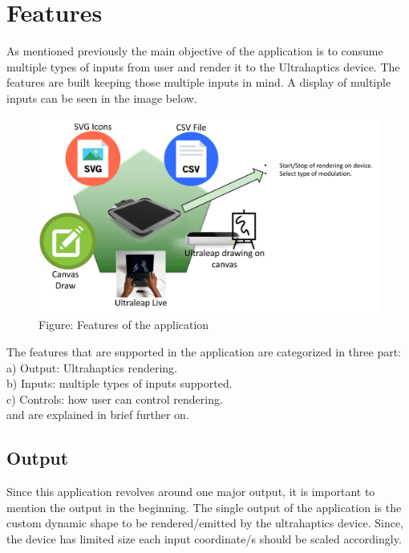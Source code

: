 %
\chapter{Features}
\label{sec:concepts}


As mentioned previously the main objective of the application is to consume multiple types of 
inputs from user and render it to the 
Ultrahaptics device. The features are built keeping those multiple inputs in mind. 
A display of multiple inputs can be seen in the image below.
\begin{figure}[htb]
	\includegraphics[width=\textwidth]{gfx/Features.png}
	\caption{Figure: Features of the application}
	\label{fig:features}
\end{figure}
The features that are supported in the application are categorized in three part: \\[2mm]
a) Output: Ultrahaptics rendering.\\
b) Inputs: multiple types of inputs supported.\\
c) Controls: how user can control rendering.\\[2mm]
and are explained in brief further on.
\section{Output}
Since this application revolves around one major output, it is important to mention 
the output in the beginning. The single output of the application is 
the custom dynamic shape to be rendered/emitted by the ultrahaptics device. 
Since, the device has limited size each input coordinate/s should  be scaled accordingly.

